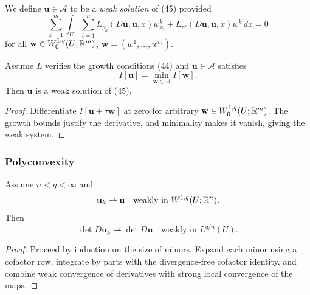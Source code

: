 \begin{definition}
\label{def:weak-solution-euler-lagrange-system}
We define $\mathbf{u} \in \mathcal{A}$ to be a \textit{weak solution} of (45) provided
\[
\sum_{k=1}^m \int_U \sum_{i=1}^n L_{p_k^i}(D\mathbf{u}, \mathbf{u}, x)w^k_{x_i} + L_{z^k}(D\mathbf{u}, \mathbf{u}, x)w^k \, dx = 0
\]
for all $\mathbf{w} \in W_0^{1,q}(U; \mathbb{R}^m)$, $\mathbf{w} = (w^1, \ldots, w^m)$.
\end{definition}

\begin{theorem}
\label{thm:weak-solution-euler-lagrange-system}

Assume $L$ verifies the growth conditions (44) and $\mathbf{u} \in \mathcal{A}$ satisfies
\[
I[\mathbf{u}] = \min_{\mathbf{w} \in \mathcal{A}} I[\mathbf{w}].
\]
Then $\mathbf{u}$ is a weak solution of (45).
\end{theorem}

\begin{proof}
\sketch Differentiate $I[\mathbf u+\tau\mathbf w]$ at zero for arbitrary $\mathbf w\in W_0^{1,q}(U;\mathbb{R}^m)$. The growth bounds justify the derivative, and minimality makes it vanish, giving the weak system.
\end{proof}

\subsubsection{Polyconvexity}

\begin{lemma}
\label{lem:weak-continuity-of-determinants}

Assume $n < q < \infty$ and
\[
\mathbf{u}_k \rightharpoonup \mathbf{u} \quad \text{weakly in } W^{1,q}(U; \mathbb{R}^n).
\]
Then
\[
\det D\mathbf{u}_k \rightharpoonup \det D\mathbf{u} \quad \text{weakly in } L^{q/n}(U).
\]
\end{lemma}

\begin{proof}
\sketch Proceed by induction on the size of minors. Expand each minor using a cofactor row, integrate by parts with the divergence-free cofactor identity, and combine weak convergence of derivatives with strong local convergence of the maps.
\end{proof}

